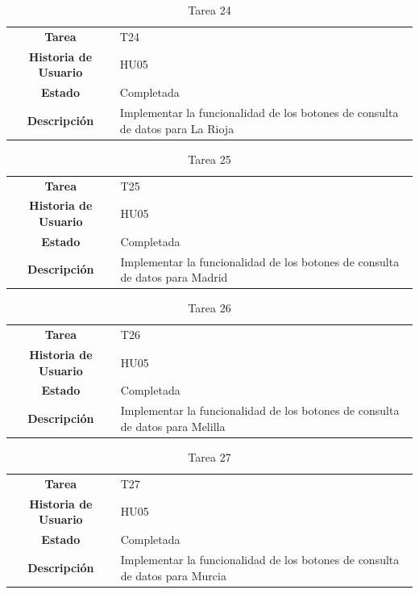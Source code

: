 \begin{table}[H]
	\begin{center}
		\begin{tabular}{| c | p{9cm} |}
			\hline
			
			\textbf{Tarea} & T24 \\
			\textbf{Historia de Usuario} & HU05 \\
			\textbf{Estado} & Completada \\
			\textbf{Descripción} & Implementar la funcionalidad de los botones de consulta de datos para La Rioja \\ \hline
		\end{tabular}
		\caption{Tarea 24}
	\end{center}
\end{table}

\begin{table}[H]
	\begin{center}
		\begin{tabular}{| c | p{9cm} |}
			\hline
			
			\textbf{Tarea} & T25 \\
			\textbf{Historia de Usuario} & HU05 \\
			\textbf{Estado} & Completada \\
			\textbf{Descripción} & Implementar la funcionalidad de los botones de consulta de datos para Madrid \\ \hline
		\end{tabular}
		\caption{Tarea 25}
	\end{center}
\end{table}

\begin{table}[H]
	\begin{center}
		\begin{tabular}{| c | p{9cm} |}
			\hline
			
			\textbf{Tarea} & T26 \\
			\textbf{Historia de Usuario} & HU05 \\
			\textbf{Estado} & Completada \\
			\textbf{Descripción} & Implementar la funcionalidad de los botones de consulta de datos para Melilla \\ \hline
		\end{tabular}
		\caption{Tarea 26}
	\end{center}
\end{table}

\begin{table}[H]
	\begin{center}
		\begin{tabular}{| c | p{9cm} |}
			\hline
			
			\textbf{Tarea} & T27 \\
			\textbf{Historia de Usuario} & HU05 \\
			\textbf{Estado} & Completada \\
			\textbf{Descripción} & Implementar la funcionalidad de los botones de consulta de datos para Murcia \\ \hline
		\end{tabular}
		\caption{Tarea 27}
	\end{center}
\end{table}

